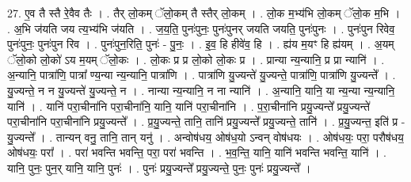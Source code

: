 \documentclass[17pt]{extarticle}
\begin{document}
27. ए॒व तै स्तै रे॒वैव तैः । . तैर् लो॒कम् ॅलो॒कम् तै स्तैर् लो॒कम् । . लो॒क म॒भ्य॑भि लो॒कम् ॅलो॒क म॒भि । . अ॒भि ज॑यति जय त्य॒भ्य॑भि ज॑यति । . ज॒य॒ति॒ पुनः॑पुनः॒ पुनः॑पुनर् जयति जयति॒ पुनः॑पुनः । . पुनः॑पुन रिवेव॒ पुनः॑पुनः॒ पुनः॑पुन रिव । . पुनः॑पुन॒रिति॒ पुनः॑ - पु॒नः॒ । . इ॒व॒ हि हीवे॑व॒ हि । . ह्य॑य म॒यꣳ हि ह्य॑यम् । . अ॒यम् ॅलो॒को लो॒को॑ ऽय म॒यम् ॅलो॒कः । . लो॒कः प्र प्र लो॒को लो॒कः प्र । . प्रान्या न्य॒न्यानि॒ प्र प्रा न्यानि॑ । . अ॒न्यानि॒ पात्रा॑णि॒ पात्रा᳚ ण्य॒न्या न्य॒न्यानि॒ पात्रा॑णि । . पात्रा॑णि यु॒ज्यन्ते॑ यु॒ज्यन्ते॒ पात्रा॑णि॒ पात्रा॑णि यु॒ज्यन्ते᳚ । . यु॒ज्यन्ते॒ न न यु॒ज्यन्ते॑ यु॒ज्यन्ते॒ न । . नान्या न्य॒न्यानि॒ न ना न्यानि॑ । . अ॒न्यानि॒ यानि॒ या न्य॒न्या न्य॒न्यानि॒ यानि॑ । . यानि॑ परा॒चीना॑नि परा॒चीना॑नि॒ यानि॒ यानि॑ परा॒चीना॑नि । . प॒रा॒चीना॑नि प्रयु॒ज्यन्ते᳚ प्रयु॒ज्यन्ते॑ परा॒चीना॑नि परा॒चीना॑नि प्रयु॒ज्यन्ते᳚ । . प्र॒यु॒ज्यन्ते॒ तानि॒ तानि॑ प्रयु॒ज्यन्ते᳚ प्रयु॒ज्यन्ते॒ तानि॑ । . प्र॒यु॒ज्यन्त॒ इति॑ प्र - यु॒ज्यन्ते᳚ । . तान्यन् वनु॒ तानि॒ तान् यनु॑ । . अन्वोष॑धय॒ ओष॑ध॒यो ऽन्वन् वोष॑धयः । . ओष॑धयः॒ परा॒ परौष॑धय॒ ओष॑धयः॒ परा᳚ । . परा॑ भवन्ति भवन्ति॒ परा॒ परा॑ भवन्ति । . भ॒व॒न्ति॒ यानि॒ यानि॑ भवन्ति भवन्ति॒ यानि॑ । . यानि॒ पुनः॒ पुन॒र् यानि॒ यानि॒ पुनः॑ । . पुनः॑ प्रयु॒ज्यन्ते᳚ प्रयु॒ज्यन्ते॒ पुनः॒ पुनः॑ प्रयु॒ज्यन्ते᳚ । \newline
\end{document}
